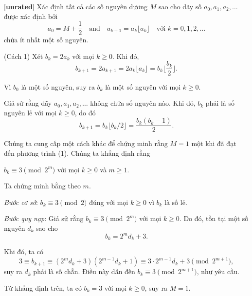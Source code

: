 \documentclass[../02-modular-arithmetic-b.tex]{subfiles}
\begin{document}
\begin{example*}\label{example:IMO-2015-N1}[\textbf{unrated}]
    Xác định tất cả các số nguyên dương \( M \) sao cho dãy số \( a_0, a_1, a_2, \dots \) được xác định bởi  
    \[
        a_0 = M + \frac{1}{2}\quad \text{and}\quad a_{k+1} = a_k \lfloor a_k \rfloor \quad \text{với } k = 0, 1, 2, \dots
    \]
    chứa ít nhất một số nguyên.
\end{example*}

\begin{soln}\footnotemark(Cách 1)
    Xét \( b_k = 2a_k \) với mọi \( k \geq 0 \). Khi đó,    
    \[
        b_{k+1} = 2a_{k+1} = 2a_k \lfloor a_k \rfloor = b_k \lfloor \frac{b_k}{2} \rfloor.
    \]
    
    Vì \( b_0 \) là một số nguyên, suy ra \( b_k \) là một số nguyên với mọi \( k \geq 0 \).  
    
    Giả sử rằng dãy \( a_0, a_1, a_2, \dots \) không chứa số nguyên nào. Khi đó, \( b_k \) phải là số nguyên lẻ với mọi \( k \geq 0 \), do đó  
    \[
        b_{k+1} = b_k \lfloor b_k / 2 \rfloor = \frac{b_k (b_k - 1)}{2}. \tag{1}
    \]
    
    Chúng ta cung cấp một cách khác để chứng minh rằng \( M = 1 \) một khi đã đạt đến phương trình (1). 
    Chúng ta khẳng định rằng 
    \begin{claim*} 
        \(b_k \equiv 3 \pmod{2^m} \) với mọi \( k \geq 0 \) và \( m \geq 1 \).
    \end{claim*}
    \begin{subproof}
        Ta chứng minh bằng  theo \( m \).  
        
        \textit{Bước cơ sở}: \( b_k \equiv 3 \pmod{2} \) đúng với mọi \( k \geq 0 \) vì \( b_k \) là số lẻ.  
        
        \textit{Bước quy nạp}: Giả sử rằng \( b_k \equiv 3 \pmod{2^m} \) với mọi \( k \geq 0 \). Do đó, tồn tại một số nguyên \( d_k \) sao cho  
        \[
            b_k = 2^m d_k + 3.
        \]  
          
        Khi đó, ta có  
        \[
            3 \equiv b_{k+1} \equiv (2^m d_k + 3)(2^{m-1} d_k + 1) \equiv 3 \cdot 2^{m-1} d_k + 3 \pmod{2^{m+1}},
        \]  
        suy ra \( d_k \) phải là số chẵn. Điều này dẫn đến \( b_k \equiv 3 \pmod{2^{m+1}} \), như yêu cầu.      
    \end{subproof}
    
    Từ khẳng định trên, ta có \( b_k = 3 \) với mọi \( k \geq 0 \), suy ra \( M = 1 \).  
\end{soln}

\end{document}
